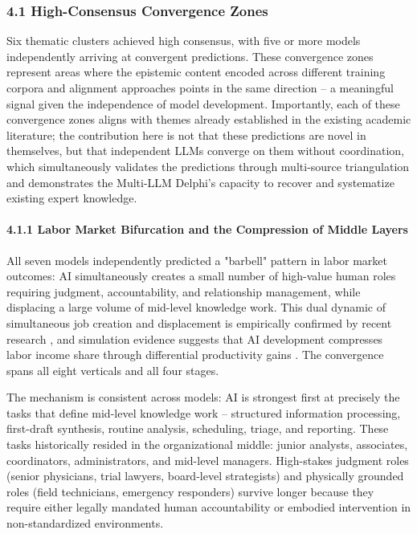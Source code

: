 \documentclass{article}
\begin{document}
\subsubsection{4.1 High-Consensus Convergence Zones}
\label{sec:4_1_high_consensus_convergence_zones}

Six thematic clusters achieved high consensus, with five or more models independently arriving at convergent predictions. These convergence zones represent areas where the epistemic content encoded across different training corpora and alignment approaches points in the same direction -- a meaningful signal given the independence of model development. Importantly, each of these convergence zones aligns with themes already established in the existing academic literature; the contribution here is not that these predictions are novel in themselves, but that independent LLMs converge on them without coordination, which simultaneously validates the predictions through multi-source triangulation and demonstrates the Multi-LLM Delphi's capacity to recover and systematize existing expert knowledge.


\paragraph{4.1.1 Labor Market Bifurcation and the Compression of Middle Layers}

All seven models independently predicted a "barbell" pattern in labor market outcomes: AI simultaneously creates a small number of high-value human roles requiring judgment, accountability, and relationship management, while displacing a large volume of mid-level knowledge work. This dual dynamic of simultaneous job creation and displacement is empirically confirmed by recent research \citep{acemoglu2022, choi2024ailabor}, and simulation evidence suggests that AI development compresses labor income share through differential productivity gains \citep{qian2023ailaborincome}. The convergence spans all eight verticals and all four stages.

The mechanism is consistent across models: AI is strongest first at precisely the tasks that define mid-level knowledge work -- structured information processing, first-draft synthesis, routine analysis, scheduling, triage, and reporting. These tasks historically resided in the organizational middle: junior analysts, associates, coordinators, administrators, and mid-level managers. High-stakes judgment roles (senior physicians, trial lawyers, board-level strategists) and physically grounded roles (field technicians, emergency responders) survive longer because they require either legally mandated human accountability or embodied intervention in non-standardized environments.
\end{document}
